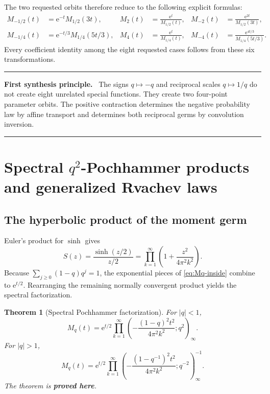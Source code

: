 \documentclass[11pt,oneside]{article}
\numberwithin{equation}{section}
\newtheorem{theorem}{Theorem}[section]
\theoremstyle{definition}
\theoremstyle{remark}
\newcommand{\e}{\mathrm e}
\newcommand{\qpoch}[3]{\left(#1;#2\right)_{#3}}
\newcommand{\proved}{\textcolor{deepgreen}{\textbf{proved here}}}
\newenvironment{resultbox}[1]{%
  \par\medskip\noindent\begin{center}\begin{minipage}{0.94\textwidth}%
  \color{deepgreen}\hrule\vspace{0.65em}%
  \color{black}\textbf{\color{deepgreen}#1.}\ }{%
  \par\vspace{0.65em}\color{deepgreen}\hrule
  \end{minipage}\end{center}\medskip}
\begin{document}
The two requested orbits therefore reduce to the following explicit formulas:
\begin{align}
 M_{-1/2}(t)&=\e^{-t}M_{1/2}(3t),
 &M_2(t)&=\frac{\e^t}{M_{1/2}(t)},
 &M_{-2}(t)&=\frac{\e^{2t}}{M_{1/2}(3t)},
 \label{eq:dyadic-orbit}\\
 M_{-1/4}(t)&=\e^{-t/3}M_{1/4}(5t/3),
 &M_4(t)&=\frac{\e^t}{M_{1/4}(t)},
 &M_{-4}(t)&=\frac{\e^{4t/3}}{M_{1/4}(5t/3)}.
 \label{eq:quartic-orbit}
\end{align}
Every coefficient identity among the eight requested cases follows from these
six transformations.

\begin{resultbox}{First synthesis principle}
The signs $q\mapsto-q$ and reciprocal scales $q\mapsto1/q$ do not create eight
unrelated special functions.  They create two four-point parameter orbits.
The positive contraction determines the negative probability law by affine
transport and determines both reciprocal germs by convolution inversion.
\end{resultbox}

\section[Spectral q-squared Pochhammer products and generalized Rvachev laws]{Spectral $q^2$-Pochhammer products and generalized Rvachev laws}
\label{sec:spectral}

\subsection{The hyperbolic product of the moment germ}

Euler's product for $\sinh$ gives
\begin{equation}
 S(z)=\frac{\sinh(z/2)}{z/2}
 =\prod_{k=1}^{\infty}\left(1+\frac{z^2}{4\pi^2k^2}\right).
 \label{eq:sinh-product}
\end{equation}
Because $\sum_{j\ge0}(1-q)q^j=1$, the exponential pieces of
\eqref{eq:Mq-inside} combine to $\e^{t/2}$.  Rearranging the remaining
normally convergent product yields the spectral factorization.

\begin{theorem}[Spectral Pochhammer factorization]
\label{thm:spectral-Pochhammer}
For $|q|<1$,
\begin{equation}
 \boxed{
 M_q(t)=\e^{t/2}
 \prod_{k=1}^{\infty}
 \qpoch{-\dfrac{(1-q)^2t^2}{4\pi^2k^2}}{q^2}{\infty}.}
 \label{eq:M-Pochhammer-inside}
\end{equation}
For $|q|>1$,
\begin{equation}
 \boxed{
 M_q(t)=\e^{t/2}
 \prod_{k=1}^{\infty}
 \qpoch{-\dfrac{(1-q^{-1})^2t^2}{4\pi^2k^2}}{q^{-2}}{\infty}^{-1}.}
 \label{eq:M-Pochhammer-outside}
\end{equation}
The theorem is \proved.
\end{theorem}
\end{document}
